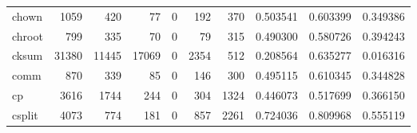 \begin{tabular}{lrrrrrrrrr}
chown     &                                               1059 &                                                420 &                                                 77 &                                                  0 &                                                192 &                                                370 &                                           0.503541 &                               0.603399 &                             0.349386 \\
chroot    &                                                799 &                                                335 &                                                 70 &                                                  0 &                                                 79 &                                                315 &                                           0.490300 &                               0.580726 &                             0.394243 \\
cksum     &                                              31380 &                                              11445 &                                              17069 &                                                  0 &                                               2354 &                                                512 &                                           0.208564 &                               0.635277 &                             0.016316 \\
comm      &                                                870 &                                                339 &                                                 85 &                                                  0 &                                                146 &                                                300 &                                           0.495115 &                               0.610345 &                             0.344828 \\
cp        &                                               3616 &                                               1744 &                                                244 &                                                  0 &                                                304 &                                               1324 &                                           0.446073 &                               0.517699 &                             0.366150 \\
csplit    &                                               4073 &                                                774 &                                                181 &                                                  0 &                                                857 &                                               2261 &                                           0.724036 &                               0.809968 &                             0.555119 \\

\end{tabular}
